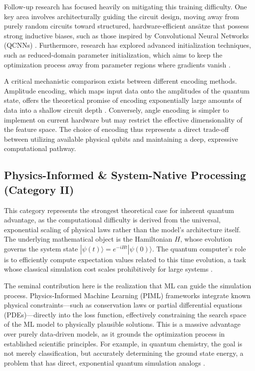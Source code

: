 \documentclass{article}
\begin{document}
Follow-up research has focused heavily on mitigating this training difficulty. One key area involves architecturally guiding the circuit design, moving away from purely random circuits toward structured, hardware-efficient ansätze that possess strong inductive biases, such as those inspired by Convolutional Neural Networks (QCNNs) \cite{chen2022quantum}. Furthermore, research has explored advanced initialization techniques, such as reduced-domain parameter initialization, which aims to keep the optimization process away from parameter regions where gradients vanish \cite{wang2024trainability}.

A critical mechanistic comparison exists between different encoding methods. Amplitude encoding, which maps input data onto the amplitudes of the quantum state, offers the theoretical promise of encoding exponentially large amounts of data into a shallow circuit depth \cite{shukla2024efficient}. Conversely, angle encoding is simpler to implement on current hardware but may restrict the effective dimensionality of the feature space. The choice of encoding thus represents a direct trade-off between utilizing available physical qubits and maintaining a deep, expressive computational pathway.

\subsection{Physics-Informed \& System-Native Processing (Category II)}

\label{sec:physics\_informed\_system\_native\_processin}

This category represents the strongest theoretical case for inherent quantum advantage, as the computational difficulty is derived from the universal, exponential scaling of physical laws rather than the model's architecture itself. The underlying mathematical object is the Hamiltonian $H$, whose evolution governs the system state $|\psi(t)\rangle = e^{-iHt}|\psi(0)\rangle$. The quantum computer's role is to efficiently compute expectation values related to this time evolution, a task whose classical simulation cost scales prohibitively for large systems .

The seminal contribution here is the realization that ML can guide the simulation process. Physics-Informed Machine Learning (PIML) frameworks  integrate known physical constraints---such as conservation laws or partial differential equations (PDEs)---directly into the loss function, effectively constraining the search space of the ML model to physically plausible solutions. This is a massive advantage over purely data-driven models, as it grounds the optimization process in established scientific principles. For example, in quantum chemistry, the goal is not merely classification, but accurately determining the ground state energy, a problem that has direct, exponential quantum simulation analogs .
\end{document}
